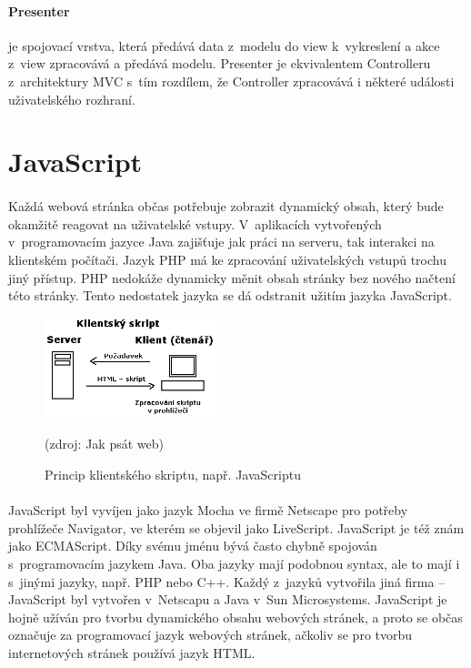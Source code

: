 \documentclass[11pt,a4paper,titlepage,oneside]{book}
\begin{document}
				\paragraph{Presenter} je spojovací vrstva, která předává data z~modelu do view k~vykreslení a akce z~view zpracovává a předává modelu. Presenter je ekvivalentem Controlleru z~architektury MVC s~tím rozdílem, že Controller zpracovává i některé události uživatelského rozhraní.

	\section{JavaScript} %
		\paragraph{} Každá webová stránka občas potřebuje zobrazit dynamický obsah, který bude okamžitě reagovat na uživatelské vstupy. V~aplikacích vytvořených v~programovacím jazyce Java zajišťuje jak práci na serveru, tak interakci na klientském počítači. Jazyk \ac{PHP} má ke zpracování uživatelských vstupů trochu jiný přístup. \ac{PHP} nedokáže dynamicky měnit obsah stránky bez nového načtení této stránky. Tento nedostatek jazyka se dá odstranit užitím jazyka JavaScript.


		\begin{figure}[!h]
			\begin{center}
				\includegraphics[width=5cm]{obrazky/klient_skript.png}
				\caption{Princip klientského skriptu, např. JavaScriptu}
				\label{fig:client}
				(zdroj: Jak psát web\cite{jakPsatWeb})
			\end{center}
		\end{figure}	
		\paragraph{} JavaScript byl vyvíjen jako jazyk Mocha ve firmě Netscape pro potřeby prohlížeče Navigator\cite{crockford}, ve kterém se objevil jako LiveScript. JavaScript je též znám jako ECMAScript. Díky svému jménu bývá často chybně spojován s~programovacím jazykem Java. Oba jazyky mají podobnou syntax, ale to mají i s~jinými jazyky, např. PHP nebo C++. Každý z~jazyků vytvořila jiná firma -- JavaScript byl vytvořen v~Netscapu a Java v~Sun Microsystems. JavaScript je hojně užíván pro tvorbu dynamického obsahu webových stránek, a proto se občas označuje za programovací jazyk webových stránek, ačkoliv se pro tvorbu internetových stránek používá jazyk \ac{HTML}.
\end{document}
